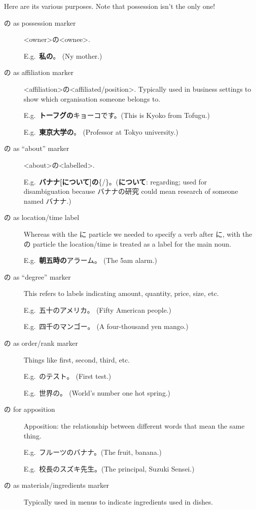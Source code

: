 \documentclass[../nihongo-gakushuu-kyouzai.tex]{subfiles}
\begin{document}
Here are its various purposes. Note that possession isn't the only one!
\begin{description}
    \item[の as possession marker] <owner>の<ownee>.

    E.g.\ \textbf{私の}。 (Ny mother.)
    \item[の as affiliation marker] <affiliation>の<affiliated/position>. Typically used in business settings to show which organisation someone belongs to.

    E.g.\ \textbf{トーフグの}キョーコです。(This is Kyoko from Tofugu.)

    E.g.\ \textbf{東京大学の}。 (Professor at Tokyo university.)
    \item[の as ``about'' marker] <about>の<labelled>.

    E.g.\ \textbf{バナナ[について]の}\{/\}。(\textbf{について}: regarding; used for disambiguation because バナナの研究 could mean research of someone named バナナ.)
    \item[の as location/time label] Whereas with the に particle we needed to specify a verb after に, with the の particle the location/time is treated as a label for the main noun.

    E.g.\ \textbf{朝五時の}アラーム。 (The 5am alarm.)
    \item[の as ``degree'' marker] This refers to labels indicating amount, quantity, price, size, etc.

    E.g.\ 五十のアメリカ。 (Fifty American people.)

    E.g.\ 四千のマンゴー。 (A four-thousand yen mango.)
    \item[の as order/rank marker] Things like first, second, third, etc.

    E.g.\ のテスト。 (First test.)

    E.g.\ 世界の。 (World's number one hot spring.)
    \item[の for apposition] Apposition: the relationship between different words that mean the same thing.

    E.g.\ フルーツのバナナ。(The fruit, banana.)

    E.g.\ 校長のスズキ先生。(The principal, Suzuki Sensei.)
    \item[の as materials/ingredients marker] Typically used in menus to indicate ingredients used in dishes.


\end{description}
\end{document}
